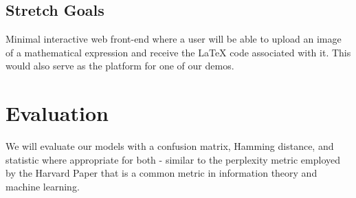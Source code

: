 \documentclass[]{article}
\begin{document}
\subsection{Stretch Goals}

Minimal interactive web front-end where a user will be able to upload an image
of a mathematical expression and receive the \LaTeX{} code associated with it. This would also serve as the platform for one of our demos.

\section{Evaluation}

We will evaluate our models with a confusion matrix, Hamming distance, and
statistic where appropriate for both - similar to the perplexity metric employed by the Harvard Paper that is a common metric in information theory and machine learning.

\printbibliography{}
\end{document}
